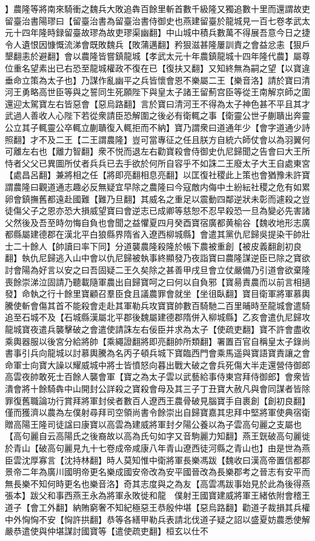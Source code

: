 】農隆等將南來騎衝之魏兵大敗追犇百餘里斬首數千級隆又獨追數十里而還謂故吏留臺治書陽璆曰【留臺治書為留臺治書侍御史也燕建留臺於龍城見一百七卷孝武太元十四年隆時録留臺故璆為故吏璆渠幽翻】中山城中積兵數萬不得展吾意今日之捷令人遺恨因慷慨流涕會既敗魏兵【敗蒲邁翻】矜狠滋甚隆屢訓責之會益忿恚【狠戶墾翻恚於避翻】會以農隆皆嘗鎮龍城【孝武太元十年農鎮龍城十四年隆代農】屬尊位重名望素出已右恐至龍城權政不復在已【復扶又翻】又知終無為嗣之望【以寶違垂命立策為太子也】乃謀作亂幽平之兵皆懷會恩不樂屬二王【樂音洛】請於寶曰清河王勇略高世臣等與之誓同生死願陛下與皇太子諸王留薊宫臣等從王南解京師之圍還迎太駕寶左右皆惡會【惡烏路翻】言於寶曰清河王不得為太子神色甚不平且其才武過人善收人心陛下若從衆請臣恐解圍之後必有衛輒之事【衛靈公世子蒯聵出奔靈公立其子輒靈公卒輒立蒯聵復入輒拒而不納】寶乃謂衆曰道通年少【會字道通少詩照翻】才不及二王【二王謂農隆】豈可當專征之任且朕方自統六師仗會以為羽翼何可離左右也【離力智翻】衆不悦而退左右勸寶殺會侍御史仇尼歸聞之告會曰大王所恃者父父已異圖所仗者兵兵已去手欲於何所自容乎不如誅二王廢太子大王自處東宮【處昌呂翻】兼將相之任【將即亮翻相息亮翻】以匡復社稷此上策也會猶豫未許寶謂農隆曰觀道通志趣必反無疑宜早除之農隆曰今寇敵内侮中土紛紜社稷之危有如累卵會鎮撫舊都遠赴國難【難乃旦翻】其威名之重足以震動四鄰逆狀未彰而遽殺之豈徒傷父子之恩亦恐大損威望寶曰會逆志已成卿等慈恕不忍早殺恐一旦為變必先害諸父然後及吾至時勿悔自負也會聞之益懼夏四月癸酉寶宿廣都黄榆谷【魏收地形志廣都縣屬建德郡在漢北平白狼縣界隋省入遼西柳城縣】會遣其黨仇尼歸吳提染干帥壯士二十餘人【帥讀曰率下同】分道襲農隆殺隆於帳下農被重創【被皮義翻創初良翻】執仇尼歸逃入山中會以仇尼歸被執事終顯發乃夜詣寶曰農隆謀逆臣已除之寶欲討會陽為好言以安之曰吾固疑二王久矣除之甚善甲戌旦會立仗嚴備乃引道會欲棄隆喪餘崇涕泣固請乃聽載隨軍農出自歸寶呵之曰何以自負邪【寶昜責農而以前言相擿發】命執之行十餘里寶顧召羣臣食且議農罪會就坐【坐徂臥翻】寶目衛軍將軍慕輿騰使斬會傷其首不能殺會走赴其軍勒兵攻寶寶帥數百騎馳二百里晡時至龍城會遣騎追至石城不及【石城縣漢屬北平郡後魏屬建德郡隋併入柳城縣】乙亥會遣仇尼歸攻龍城寶夜遣兵襲擊破之會遣使請誅左右佞臣并求為太子【使疏吏翻】寶不許會盡收乘輿器服以後宮分給將帥【乘繩證翻將即亮翻帥所類翻】署置百官自稱皇太子錄尚書事引兵向龍城以討慕輿騰為名丙子頓兵城下寶臨西門會乘馬遥與寶語寶責讓之會命軍士向寶大譟以耀威城中將士皆憤怒向暮出戰大破之會兵死傷大半走還營侍御郎高雲夜帥敢死士百餘人襲會軍【寶之為太子雲以武藝給事侍東宫拜侍御郎】會衆皆潰會將十餘騎犇中山開封公詳殺之寶殺會母及其三子丁丑寶大赦凡與會同謀者皆除罪復舊職論功行賞拜將軍封侯者數百人遼西王農骨破見腦寶手自裹創【創初良翻】僅而獲濟以農為左僕射尋拜司空領尚書令餘崇出自歸寶嘉其忠拜中堅將軍使典宿衛贈高陽王隆司徒諡曰康寶以高雲為建威將軍封夕陽公養以為子雲高句麗之支屬也【高句麗自云高陽氏之後裔故以高為氏句如字又音駒麗力知翻】燕王皝破高句麗徙於青山【破高句麗見九十七卷成帝咸康八年青山遼西徒河縣之青山也】由是世為燕臣雲沈厚寡言【沈持林翻】時人莫知惟中衛將軍長樂馮跋【魏收曰漢高帝置信都郡景帝二年為廣川國明帝更名樂成國安帝改為安平國晉改為長樂郡考之晉志有安平而無長樂不知何時更名也樂音洛】奇其志度與之為友【高雲馮跋事始見於此為後得燕張本】跋父和事西燕王永為將軍永敗徙和龍　僕射王國寶建威將軍王緒依附會稽王道子【會工外翻】納賄窮奢不知紀極惡王恭殷仲堪【惡烏路翻】勸道子裁損其兵權中外恟恟不安【恟許拱翻】恭等各繕甲勒兵表請北伐道子疑之詔以盛夏妨農悉使解嚴恭遣使與仲堪謀討國寶等【遣使疏吏翻】桓玄以仕不